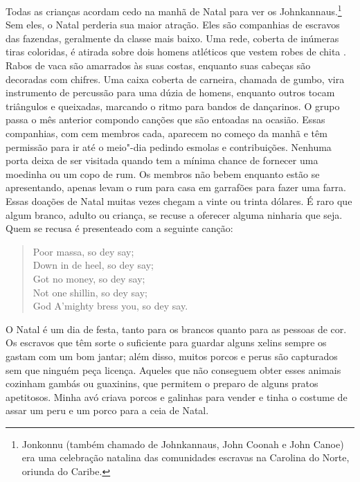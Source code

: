Todas as crianças acordam cedo na manhã
de Natal para ver os Johnkannaus.\footnote{Jonkonnu (também chamado de
  Johnkannaus, John Coonah e John Canoe) era uma celebração natalina das
  comunidades escravas na Carolina do Norte, oriunda do Caribe.} Sem
eles, o Natal perderia sua maior atração. Eles são companhias de
escravos das fazendas, geralmente da classe mais baixo. Uma rede,
coberta de inúmeras tiras coloridas, é atirada sobre dois homens
atléticos que vestem robes de chita . Rabos de vaca são amarrados às
suas costas, enquanto suas cabeças são decoradas com chifres. Uma caixa
coberta de carneira, chamada de gumbo, vira instrumento de percussão
para uma dúzia de homens, enquanto outros tocam triângulos e queixadas,
marcando o ritmo para bandos de dançarinos. O grupo passa o mês anterior
compondo canções que são entoadas na ocasião. Essas companhias, com cem
membros cada, aparecem no começo da manhã e têm permissão para ir até o
meio"-dia pedindo esmolas e contribuições. Nenhuma porta deixa de ser
visitada quando tem a mínima chance de fornecer uma moedinha ou um copo
de rum. Os membros não bebem enquanto estão se apresentando, apenas
levam o rum para casa em garrafões para fazer uma farra. Essas doações
de Natal muitas vezes chegam a vinte ou trinta dólares. É raro que algum
branco, adulto ou criança, se recuse a oferecer alguma ninharia que
seja. Quem se recusa é presenteado com a seguinte canção:

\begin{verse}
Poor massa, so dey say;\\
Down in de heel, so dey say;\\
Got no money, so dey say;\\
Not one shillin, so dey say;\\
God A'mighty bress you, so dey say.\footnotemark
\end{verse}

O Natal é um dia de festa, tanto para
os brancos quanto para as pessoas de cor. Os escravos que têm sorte o
suficiente para guardar alguns xelins sempre os gastam com um bom
jantar; além disso, muitos porcos e perus são capturados sem que ninguém
peça licença. Aqueles que não conseguem obter esses animais cozinham
gambás ou guaxinins, que permitem o preparo de alguns pratos apetitosos.
Minha avó criava porcos e galinhas para vender e tinha o costume de
assar um peru e um porco para a ceia de Natal.

